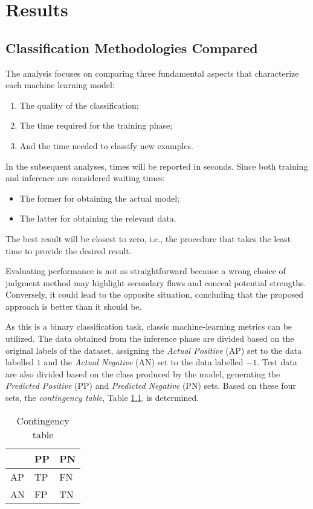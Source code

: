 \chapter{Results}

\section{Classification Methodologies Compared}\label{sec:qsvm-res}

The analysis focuses on comparing three fundamental aspects that characterize each machine learning model:
\begin{enumerate}
    \item The quality of the classification;
    \item The time required for the training phase;
    \item And the time needed to classify new examples.
\end{enumerate}

In the subsequent analyses, times will be reported in seconds. Since both training and inference are considered waiting times: 
\begin{itemize}
    \item The former for obtaining the actual model;
    \item The latter for obtaining the relevant data.
\end{itemize}

The best result will be closest to zero, i.e., the procedure that takes the least time to provide the desired result.

Evaluating performance is not as straightforward because a wrong choice of judgment method may highlight secondary flaws and conceal potential strengths. Conversely, it could lead to the opposite situation, concluding that the proposed approach is better than it should be.

As this is a binary classification task, classic machine-learning metrics can be utilized. The data obtained from the inference phase are divided based on the original labels of the dataset, assigning the \emph{Actual Positive} (AP) set to the data labelled $1$ and the \emph{Actual Negative} (AN) set to the data labelled $-1$. Test data are also divided based on the class produced by the model, generating the \emph{Predicted Positive} (PP) and \emph{Predicted Negative} (PN) sets. Based on these four sets, the \emph{contingency table}, Table \ref{tab:contingency}, is determined.

\begin{table}[h]
    \centering
    \begin{tabular}{l|ll}
       & PP & PN \\\hline
    AP & TP & FN \\
    AN & FP & TN
    \end{tabular}
    \caption{Contingency table}
    \label{tab:contingency}
\end{table}

